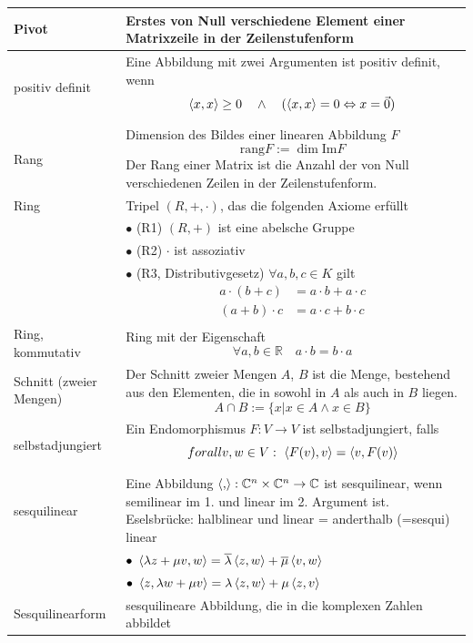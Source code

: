 \documentclass{article}
\begin{document}
\begin{xltabular}{\linewidth}{p{0.33\textwidth}|X}
	\hline
		Pivot & Erstes von Null verschiedene Element einer Matrixzeile in der Zeilenstufenform \\
	\hline
		positiv definit & Eine Abbildung mit zwei Argumenten ist positiv definit, wenn
			$$\braket{x,x}\geq 0\quad \wedge\quad (\braket{x,x} = 0 \Leftrightarrow x = \vec{0})$$ \\
	\hline
		Rang & Dimension des Bildes einer linearen Abbildung $F$
			$$\text{rang} F := \dim\text{Im} F$$ 
			Der Rang einer Matrix ist die Anzahl der von Null verschiedenen Zeilen in der Zeilenstufenform. \\
	\hline
		Ring & Tripel $(R,+,\cdot)$, das die folgenden Axiome erfüllt \\
			& $\bullet$ \textcolor{gruen}{(R1)} $(R,+)$ ist eine abelsche Gruppe \\
			& $\bullet$ \textcolor{gruen}{(R2)} $\cdot$ ist assoziativ \\
			& $\bullet$ \textcolor{gruen}{(R3, Distributivgesetz)} $\forall a,b,c\in K$  gilt
				{\begin{align*}
					a \cdot (b+c) &= a\cdot b + a\cdot c \\
					(a + b) \cdot c &= a\cdot c + b\cdot c
				\end{align*}} \\
	\hline
		Ring, kommutativ & Ring mit der Eigenschaft
			$$\forall a,b\in\mathbb{R}\quad a\cdot b = b\cdot a$$ \\
	\hline
		Schnitt (zweier Mengen) & Der Schnitt zweier Mengen $A$, $B$ ist die Menge, bestehend aus den Elementen, die in sowohl in $A$ als auch in $B$ liegen.
			$$A \cap B := \{x | x\in A \wedge x\in B\}$$ \\
	\hline
		selbstadjungiert & Ein Endomorphismus $F:V\to V$ ist selbstadjungiert, falls
			$$forall v,w\in V:\ \braket{F(v),v} = \braket{v,F(v)}$$ \\
	\hline
		sesquilinear & Eine Abbildung $\braket{,}:\mathbb{C}^n\times \mathbb{C}^n\to\mathbb{C}$ ist sesquilinear, wenn semilinear im 1. und linear im 2. Argument ist. \textcolor{gruen}{Eselsbrücke: halblinear und linear = anderthalb (=sesqui) linear} \\
		& $\bullet\ \braket{\lambda z + \mu v, w} = \overline{\lambda}\braket{z,w} + \overline{\mu}\braket{v,w}$\\
		& $\bullet\ \braket{z,\lambda w + \mu v} = \lambda\braket{z,w} + \mu\braket{z,v}$ \\
	\hline
		Sesquilinearform & sesquilineare Abbildung, die in die komplexen Zahlen abbildet \\

\end{xltabular}
\end{document}
